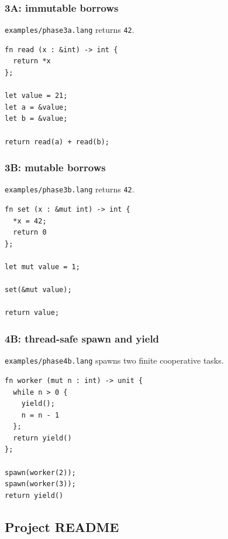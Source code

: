 \documentclass[a4paper]{article}
\begin{document}
\begin{minipage}[t]{0.48\linewidth}

\subsubsection{3A: immutable borrows}
\label{appendix:example-phase3a}

\texttt{examples/phase3a.lang} returns \texttt{42}.
\begin{lstlisting}
fn read (x : &int) -> int {
  return *x
};

let value = 21;
let a = &value;
let b = &value;

return read(a) + read(b);
\end{lstlisting}

\subsubsection{3B: mutable borrows}
\label{appendix:example-phase3b}

\texttt{examples/phase3b.lang} returns \texttt{42}.
\begin{lstlisting}
fn set (x : &mut int) -> int {
  *x = 42;
  return 0
};

let mut value = 1;

set(&mut value);

return value;
\end{lstlisting}

\subsubsection{4B: thread-safe spawn and yield}
\label{appendix:example-phase4b}

\texttt{examples/phase4b.lang} spawns two finite cooperative tasks.
\begin{lstlisting}
fn worker (mut n : int) -> unit {
  while n > 0 {
    yield();
    n = n - 1
  };
  return yield()
};

spawn(worker(2));
spawn(worker(3));
return yield()
\end{lstlisting}

\end{minipage}
\endgroup

\clearpage

\subsection{Project README}
\label{appendix:readme}
\end{document}
